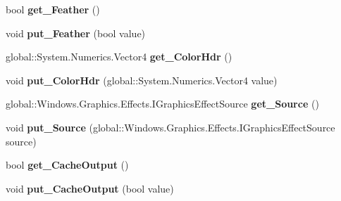 \begin{DoxyCompactItemize}
bool {\bfseries get\+\_\+\+Feather} ()
\item 
\mbox{\label{class_microsoft_1_1_graphics_1_1_canvas_1_1_effects_1_1_chroma_key_effect_aeac5b14db9370006dc382733657d23f5}} 
void {\bfseries put\+\_\+\+Feather} (bool value)
\item 
\mbox{\label{class_microsoft_1_1_graphics_1_1_canvas_1_1_effects_1_1_chroma_key_effect_a1fd7380fb44e77126b89905eccd1c946}} 
global\+::\+System.\+Numerics.\+Vector4 {\bfseries get\+\_\+\+Color\+Hdr} ()
\item 
\mbox{\label{class_microsoft_1_1_graphics_1_1_canvas_1_1_effects_1_1_chroma_key_effect_a771d1aecb4d4ffd99cfa7cafea0de2d1}} 
void {\bfseries put\+\_\+\+Color\+Hdr} (global\+::\+System.\+Numerics.\+Vector4 value)
\item 
\mbox{\label{class_microsoft_1_1_graphics_1_1_canvas_1_1_effects_1_1_chroma_key_effect_a9ce5e365c9a88cb7fb4f90d523a7c4a0}} 
global\+::\+Windows.\+Graphics.\+Effects.\+I\+Graphics\+Effect\+Source {\bfseries get\+\_\+\+Source} ()
\item 
\mbox{\label{class_microsoft_1_1_graphics_1_1_canvas_1_1_effects_1_1_chroma_key_effect_a69de4d866611df33bb052046ba1b84da}} 
void {\bfseries put\+\_\+\+Source} (global\+::\+Windows.\+Graphics.\+Effects.\+I\+Graphics\+Effect\+Source source)
\item 
\mbox{\label{class_microsoft_1_1_graphics_1_1_canvas_1_1_effects_1_1_chroma_key_effect_ada4e79dd2a24dda09784c79b527a0680}} 
bool {\bfseries get\+\_\+\+Cache\+Output} ()
\item 
\mbox{\label{class_microsoft_1_1_graphics_1_1_canvas_1_1_effects_1_1_chroma_key_effect_a69f030e8c6146b87620e64f5559343f8}} 
void {\bfseries put\+\_\+\+Cache\+Output} (bool value)

\end{DoxyCompactItemize}
